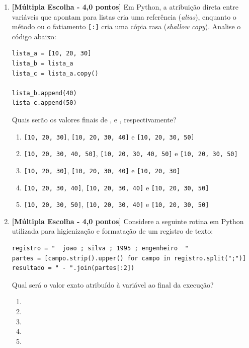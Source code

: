 \begin{enumerate}[label=\textbf{Q\arabic*.}, start=1]


\vspace{0.4cm}

\item \textbf{[Múltipla Escolha - 4,0 pontos]} Em Python, a atribuição direta entre variáveis que apontam para listas cria uma referência (\emph{alias}), enquanto o método  ou o fatiamento \texttt{[:]} cria uma cópia rasa (\emph{shallow copy}). Analise o código abaixo:
\begin{verbatim}
lista_a = [10, 20, 30]
lista_b = lista_a
lista_c = lista_a.copy()

lista_b.append(40)
lista_c.append(50)
\end{verbatim}
Quais serão os valores finais de ,  e , respectivamente?

\begin{enumerate}[label=\textbf{(\Alph*)}]
    \item \texttt{[10, 20, 30]}, \texttt{[10, 20, 30, 40]} e \texttt{[10, 20, 30, 50]}
    \item \texttt{[10, 20, 30, 40, 50]}, \texttt{[10, 20, 30, 40, 50]} e \texttt{[10, 20, 30, 50]}
    \item \texttt{[10, 20, 30]}, \texttt{[10, 20, 30, 40]} e \texttt{[10, 20, 30]}
    \item \texttt{[10, 20, 30, 40]}, \texttt{[10, 20, 30, 40]} e \texttt{[10, 20, 30, 50]}
    \item \texttt{[10, 20, 30, 50]}, \texttt{[10, 20, 30, 40]} e \texttt{[10, 20, 30, 50]}
\end{enumerate}



\vspace{0.4cm}

\item \textbf{[Múltipla Escolha - 4,0 pontos]} Considere a seguinte rotina em Python utilizada para higienização e formatação de um registro de texto:
\begin{verbatim}
registro = "  joao ; silva ; 1995 ; engenheiro  "
partes = [campo.strip().upper() for campo in registro.split(";")]
resultado = " - ".join(partes[:2])
\end{verbatim}
Qual será o valor exato atribuído à variável  ao final da execução?

\begin{enumerate}[label=\textbf{(\Alph*)}]
    \item {}
    \item {}
    \item {}
    \item {}
    \item {}
\end{enumerate}


\end{enumerate}
